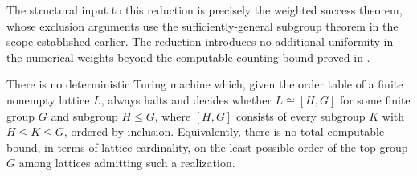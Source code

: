 The structural input to this reduction is precisely the
weighted success theorem, whose exclusion arguments use
the sufficiently-general subgroup theorem in the scope
established earlier.  The reduction introduces no
additional uniformity in the numerical weights beyond
the computable counting bound proved in
.

\begin{corollary}
\label{n:interval-undecidable}
There is no deterministic Turing machine which, given the order table
of a finite nonempty lattice $L$, always halts and decides whether
$L\cong[H,G]$ for some finite group $G$ and subgroup $H\le G$, where
$[H,G]$ consists of every subgroup $K$ with $H\le K\le G$, ordered by
inclusion.  Equivalently, there is no total computable bound, in terms
of lattice cardinality, on the least possible order of the top group
$G$ among lattices admitting such a realization.
\end{corollary}

